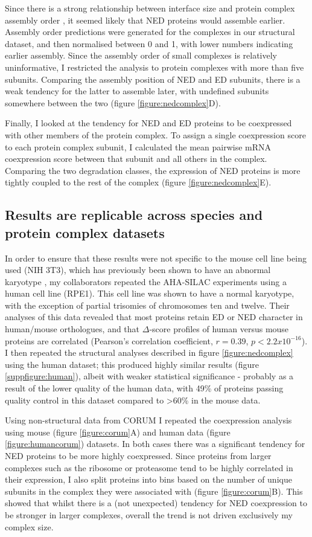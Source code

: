 \documentclass[a4paper,11pt,twoside,openright]{scrbook}
\begin{document}
Since there is a strong relationship between interface size and protein complex assembly order \cite{Marsh2013}, it seemed likely that NED proteins would assemble earlier. Assembly order predictions were generated for the complexes in our structural dataset, and then normalised between 0 and 1, with lower numbers indicating earlier assembly. Since the assembly order of small complexes is relatively uninformative, I restricted the analysis to protein complexes with more than five subunits. Comparing the assembly position of NED and ED subunits, there is a weak tendency for the latter to assemble later, with undefined subunits somewhere between the two (figure \ref{figure:nedcomplex}D).

Finally, I looked at the tendency for NED and ED proteins to be coexpressed with other members of the protein complex. To assign a single coexpression score to each protein complex subunit, I calculated the mean pairwise mRNA coexpression score between that subunit and all others in the complex. Comparing the two degradation classes, the expression of NED proteins is more tightly coupled to the rest of the complex (figure \ref{figure:nedcomplex}E).

\subsection{Results are replicable across species and protein complex datasets}
In order to ensure that these results were not specific to the mouse cell line being used (NIH 3T3), which has previously been shown to have an abnormal karyotype \cite{Leibiger2013}, my collaborators repeated the AHA-SILAC experiments using a human cell line (RPE1). This cell line was shown to have a normal karyotype, with the exception of partial trisomies of chromosomes ten and twelve. Their analyses of this data revealed that most proteins retain ED or NED character in human/mouse orthologues, and that $\Delta$-score profiles of human versus mouse proteins are correlated (Pearson’s correlation coefficient, $r = 0.39$, $p < 2.2x10^{-16}$). I then repeated the structural analyses described in figure \ref{figure:nedcomplex} using the human dataset; this produced highly similar results (figure \ref{suppfigure:human}), albeit with weaker statistical significance - probably as a result of the lower quality of the human data, with 49\% of proteins passing quality control in this dataset compared to >60\% in the mouse data.

Using non-structural data from CORUM  \cite{Ruepp2009} I repeated the coexpression analysis using mouse (figure \ref{figure:corum}A) and human data (figure \ref{figure:humancorum}) datasets. In both cases there was a significant tendency for NED proteins to be more highly coexpressed. Since proteins from larger complexes such as the ribosome or proteasome tend to be highly correlated in their expression, I also split proteins into bins based on the number of unique subunits in the complex they were associated with (figure \ref{figure:corum}B). This showed that whilst there is a (not unexpected) tendency for NED coexpression to be stronger in larger complexes, overall the trend is not driven exclusively my complex size.  
\end{document}
